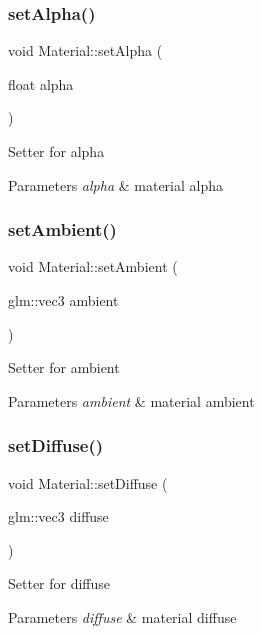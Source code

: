 \subsubsection{\texorpdfstring{set\+Alpha()}{setAlpha()}}
{\footnotesize\ttfamily void Material\+::set\+Alpha (\begin{DoxyParamCaption}\item[{float}]{alpha }\end{DoxyParamCaption})}

Setter for alpha 
\begin{DoxyParams}{Parameters}
{\em alpha} & material alpha \\
\hline
\end{DoxyParams}
\mbox{\label{classMaterial_a36e5182a10c739d2479f710bec9efd9a}} 
\subsubsection{\texorpdfstring{set\+Ambient()}{setAmbient()}}
{\footnotesize\ttfamily void Material\+::set\+Ambient (\begin{DoxyParamCaption}\item[{glm\+::vec3}]{ambient }\end{DoxyParamCaption})}

Setter for ambient 
\begin{DoxyParams}{Parameters}
{\em ambient} & material ambient \\
\hline
\end{DoxyParams}
\mbox{\label{classMaterial_ad2e2cef942772fc105110072a57e3735}} 
\subsubsection{\texorpdfstring{set\+Diffuse()}{setDiffuse()}}
{\footnotesize\ttfamily void Material\+::set\+Diffuse (\begin{DoxyParamCaption}\item[{glm\+::vec3}]{diffuse }\end{DoxyParamCaption})}

Setter for diffuse 
\begin{DoxyParams}{Parameters}
{\em diffuse} & material diffuse \\
\hline
\end{DoxyParams}
\mbox{\label{classMaterial_ac07ec3f5cf25dfce5a58637d798c8a18}} 
